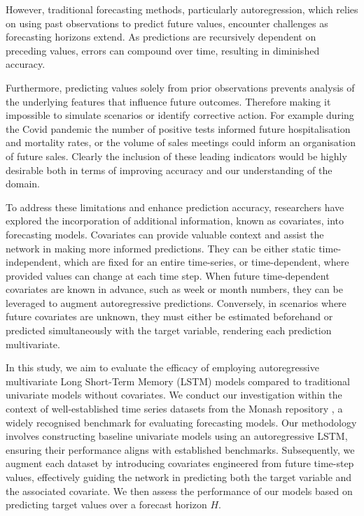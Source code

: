 \documentclass{article}
\newcommand{\horizon}{H}
\begin{document}
However, traditional forecasting methods, particularly autoregression, which relies on using past observations to 
predict future values, encounter challenges as forecasting horizons extend. As predictions are recursively 
dependent on preceding values, errors can compound over time, resulting in diminished accuracy.

Furthermore, predicting values solely from prior observations prevents analysis of the underlying features that influence future 
outcomes. Therefore making it impossible to simulate scenarios or identify corrective action. For example during the Covid 
pandemic the number of positive tests informed future hospitalisation and mortality rates, or the volume of sales 
meetings could inform an organisation of future sales.  Clearly the inclusion of these leading indicators would be highly desirable 
both in terms of improving accuracy and our understanding of the domain.

To address these limitations and enhance prediction accuracy, researchers have explored the incorporation of 
additional information, known as covariates, into forecasting models. Covariates can provide valuable context 
and assist the network in making more informed predictions. They can be either static time-independent, which are fixed 
for an entire time-series, or time-dependent, where provided values can change at each time step. 
When future time-dependent covariates are known in advance, such as week or month numbers, they can be 
leveraged to augment autoregressive predictions. Conversely, in scenarios where future covariates are unknown, 
they must either be estimated beforehand or predicted simultaneously with the target variable, rendering each 
prediction multivariate.

In this study, we aim to evaluate the efficacy of employing autoregressive multivariate Long Short-Term Memory 
(LSTM) models compared to traditional univariate models without covariates. We conduct our investigation 
within the context of well-established time series datasets from the Monash repository \cite{DBLP:conf/nips/GodahewaBWHM21}, 
a widely recognised benchmark for evaluating forecasting models. Our methodology involves constructing baseline univariate models 
using an autoregressive LSTM, ensuring their performance aligns with established benchmarks. Subsequently, we 
augment each dataset by introducing covariates engineered from future time-step values, effectively guiding 
the network in predicting both the target variable and the associated covariate. We then assess the performance 
of our models based on predicting target values over a forecast horizon $\horizon$.
\end{document}
